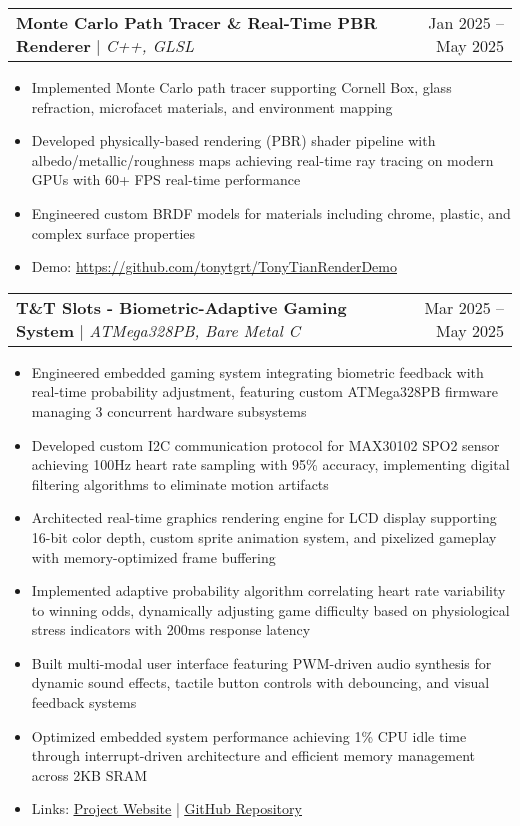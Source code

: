 \documentclass[letterpaper,11pt]{article}
\makeatletter
\newcommand{\resumeItem}[1]{
  \item\small{
    {#1 \vspace{-3pt}}
  }
}
\newcommand{\resumeProjectHeading}[2]{
    \item
    \begin{tabular*}{0.97\textwidth}{l@{\extracolsep{\fill}}r}
      \small#1 & #2 \\
    \end{tabular*}\vspace{-7pt}
}
\newcommand{\resumeItemListStart}{\begin{itemize}}
\newcommand{\resumeItemListEnd}{\end{itemize}\vspace{-5pt}}
\makeatother
\begin{document}
    \resumeProjectHeading
      {\textbf{Monte Carlo Path Tracer \& Real-Time PBR Renderer} $|$ \emph{C++, GLSL}}{Jan 2025 -- May 2025}
      \resumeItemListStart
      \resumeItem{Implemented Monte Carlo path tracer supporting Cornell Box, glass refraction, microfacet materials, and environment mapping}
      \resumeItem{Developed physically-based rendering (PBR) shader pipeline with albedo/metallic/roughness maps achieving real-time ray tracing on modern GPUs with 60+ FPS real-time performance}
      \resumeItem{Engineered custom BRDF models for materials including chrome, plastic, and complex surface properties}
      \resumeItem{Demo: \url{https://github.com/tonytgrt/TonyTianRenderDemo}}
    \resumeItemListEnd

    \resumeProjectHeading
          {\textbf{T\&T Slots - Biometric-Adaptive Gaming System} $|$ \emph{ATMega328PB, Bare Metal C}}{Mar 2025 -- May 2025}
          \resumeItemListStart
            \resumeItem{Engineered embedded gaming system integrating biometric feedback with real-time probability adjustment, featuring custom ATMega328PB firmware managing 3 concurrent hardware subsystems}
            \resumeItem{Developed custom I2C communication protocol for MAX30102 SPO2 sensor achieving 100Hz heart rate sampling with 95\% accuracy, implementing digital filtering algorithms to eliminate motion artifacts}
            \resumeItem{Architected real-time graphics rendering engine for LCD display supporting 16-bit color depth, custom sprite animation system, and pixelized gameplay with memory-optimized frame buffering}
            \resumeItem{Implemented adaptive probability algorithm correlating heart rate variability to winning odds, dynamically adjusting game difficulty based on physiological stress indicators with 200ms response latency}
            \resumeItem{Built multi-modal user interface featuring PWM-driven audio synthesis for dynamic sound effects, tactile button controls with debouncing, and visual feedback systems}
            \resumeItem{Optimized embedded system performance achieving 1\% CPU idle time through interrupt-driven architecture and efficient memory management across 2KB SRAM}
            \resumeItem{Links: \href{https://upenn-embedded.github.io/final-project-s25-t-t-slots-sense-the-win/}{\underline{Project Website}} | \href{https://github.com/upenn-embedded/final-project-s25-t-t-slots-sense-the-win}{\underline{GitHub Repository}}}
          \resumeItemListEnd
          
\end{document}
